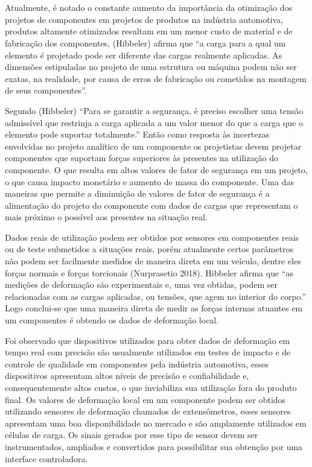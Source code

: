 

\chapter{}

Atualmente, é notado o constante aumento da importância da otimização dos projetos de componentes em projetos de produtos na indústria automotiva, produtos altamente otimizados resultam em um menor custo de material e de fabricação dos componentes, (Hibbeler) afirma que “a carga para a qual um elemento é projetado pode ser diferente das cargas realmente aplicadas. As dimensões estipuladas no projeto de uma estrutura ou máquina podem não ser exatas, na realidade, por causa de erros de fabricação ou cometidos na montagem de seus componentes”.

Segundo (Hibbeler) “Para se garantir a segurança, é preciso escolher uma tensão admissível que restrinja a carga aplicada a um valor menor do que a carga que o elemento pode suportar totalmente.” Então como resposta às incertezas envolvidas no projeto analítico de um componente os projetistas devem projetar componentes que suportam forças superiores às presentes na utilização do componente. O que resulta em altos valores de fator de segurança em um projeto, o que causa impacto monetário e aumento de massa do componente. Uma das maneiras que permite a diminuição de valores de fator de segurança é a alimentação do projeto do componente com dados de cargas que representam o mais próximo o possível aos presentes na situação real.

Dados reais de utilização podem ser obtidos por sensores em componentes reais ou de teste submetidos a situações reais, porém atualmente certos parâmetros não podem ser facilmente medidos de maneira direta em um veículo, dentre eles forças normais e forças torcionais (Nurprasetio 2018). Hibbeler afirma que “as medições de deformação são experimentais e, uma vez obtidas, podem ser relacionadas com as cargas aplicadas, ou tensões, que agem no interior do corpo.” Logo conclui-se que uma maneira direta de medir as forças internas atuantes em um componentes é obtendo os dados de deformação local.

Foi observado que dispositivos utilizados para obter dados de deformação em tempo real com precisão são usualmente utilizados em testes de impacto e de controle de qualidade em componentes pela indústria automotiva, esses dispositivos apresentam altos níveis de precisão e confiabilidade e, consequentemente altos custos, o que inviabiliza sua utilização fora do produto final. Os valores de deformação local em um componente podem ser obtidos utilizando sensores de deformação chamados de extensômetros, esses sensores apresentam uma boa disponibilidade no mercado e são amplamente utilizados em células de carga. Os sinais gerados por esse tipo de sensor devem ser instrumentados, ampliados e convertidos para possibilitar sua obtenção por uma interface controladora.

